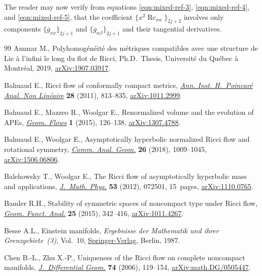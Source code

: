 \documentclass[11pt]{article}
\numberwithin{equation}{section}
\newcommand{\olg}{\overline{g}}
\DeclareMathOperator{\Rc}{Rc}
\begin{document}
The reader may now verify from equations \eqref{eqn:mixed-ref-3}, \eqref{eqn:mixed-ref-4}, and \eqref{eqn:mixed-ref-5}, that the coefficient $\big\{ x^2 \Rc_{x\alpha} \big\}_{2j+2}$ involves only components $\{ \olg_{xx} \}_{2j+1}$ and $\{ \olg_{\alpha \beta} \}_{2j+1}$ and their tangential derivatives.
\begin{thebibliography}{99}
Ammar M., Polyhomog\'en\'eit\'e des m\'etriques compatibles avec une structure
 de {L}ie \`a l'infini le long du flot de {R}icci, Ph.D.~Thesis, Universit\'e
 du Qu\'ebec \`a Montr\'eal, 2019, \href{https://arxiv.org/abs/1907.03917}{arXiv:1907.03917}.

Bahuaud E., Ricci flow of conformally compact metrics, \href{https://doi.org/10.1016/j.anihpc.2011.03.007}{\textit{Ann. Inst.
 H.~Poincar\'{e} Anal. Non Lin\'{e}aire}} \textbf{28} (2011), 813--835,
 \href{https://arxiv.org/abs/1011.2999}{arXiv:1011.2999}.

Bahuaud E., Mazzeo R., Woolgar E., Renormalized volume and the evolution of
 {APE}s, \href{https://doi.org/10.1515/geofl-2015-0007}{\textit{Geom. Flows}} \textbf{1} (2015), 126--138, \href{https://arxiv.org/abs/1307.4788}{arXiv:1307.4788}.

Bahuaud E., Woolgar E., Asymptotically hyperbolic normalized {R}icci flow and
 rotational symmetry, \href{https://doi.org/10.4310/CAG.2018.v26.n5.a1}{\textit{Comm. Anal. Geom.}} \textbf{26} (2018),
 1009--1045, \href{https://arxiv.org/abs/1506.06806}{arXiv:1506.06806}.

Balehowsky T., Woolgar E., The {R}icci flow of asymptotically hyperbolic mass
 and applications, \href{https://doi.org/10.1063/1.4732118}{\textit{J.~Math. Phys.}} \textbf{53} (2012), 072501,
 15~pages, \href{https://arxiv.org/abs/1110.0765}{arXiv:1110.0765}.

Bamler R.H., Stability of symmetric spaces of noncompact type under {R}icci
 flow, \href{https://doi.org/10.1007/s00039-015-0317-8}{\textit{Geom. Funct. Anal.}} \textbf{25} (2015), 342--416,
 \href{https://arxiv.org/abs/1011.4267}{arXiv:1011.4267}.

Besse A.L., Einstein manifolds, \textit{Ergebnisse der Mathematik und ihrer
 Grenzgebiete~(3)}, Vol.~10, \href{https://doi.org/10.1007/978-3-540-74311-8}{Springer-Verlag}, Berlin, 1987.

Chen B.-L., Zhu X.-P., Uniqueness of the {R}icci flow on complete noncompact
 manifolds, \href{https://doi.org/10.4310/jdg/1175266184}{\textit{J.~Differential Geom.}} \textbf{74} (2006), 119--154,
 \href{https://arxiv.org/abs/math.DG/0505447}{arXiv:math.DG/0505447}.


\end{thebibliography}
\end{document}
